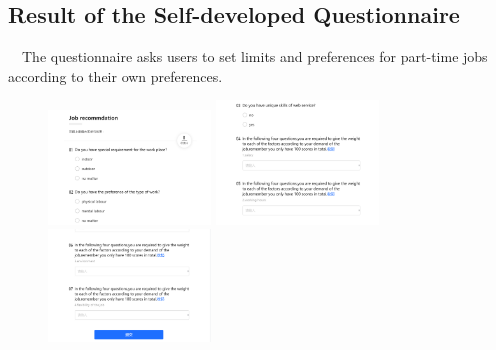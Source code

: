 \documentclass[12pt]{article}
\begin{document}
\begin{appendix}
    \subsection{Result of the Self-developed Questionnaire}
    ~~The questionnaire asks users to set limits and preferences for part-time jobs according to their own preferences.\\%
    \begin{figure}[!htbp]
        \centering
        {
        \begin{minipage}[t]{0.3\linewidth}
        \centering
        \includegraphics[width=1.7in]{figure/t1.png}
        \end{minipage}%
        }%
        {
        \begin{minipage}[t]{0.3\linewidth}
        \centering
        \includegraphics[width=1.7in]{figure/t2.png}
        \end{minipage}%
        }%
        {
        \begin{minipage}[t]{0.3\linewidth}
        \centering
        \includegraphics[width=1.7in]{figure/t3.png}
        \end{minipage}
        }%
    \end{figure}


\end{appendix}
\end{document}
